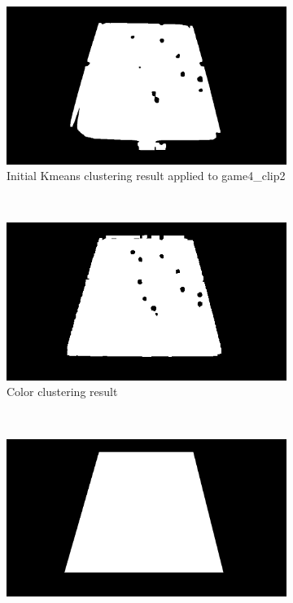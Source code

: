 \begin{figure}
    \centering
    \begin{subfigure}[b]{0.75\textwidth}
        \includegraphics[width=\textwidth]{./imgs/kmeans_cluster.png}
        \caption{Initial Kmeans clustering result applied to game4\_clip2}
        \label{fig:kmeanstabol}
    \end{subfigure}
    \\
    \begin{subfigure}[b]{0.75\textwidth}
        \includegraphics[width=\textwidth]{./imgs/color_cluster.png}
        \caption{Color clustering result}
        \label{fig:colorsegtabol}
    \end{subfigure}
    \\
    \begin{subfigure}[b]{0.75\textwidth}
        \includegraphics[width=\textwidth]{./imgs/maskfill.png}

\end{subfigure}
\end{figure}
